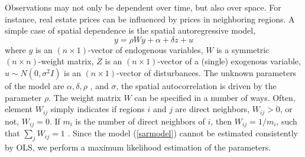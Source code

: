 \documentclass{article}
\begin{document}
Observations may not only be dependent over time, but also over space. For
instance, real estate prices can be influenced by prices in neighboring
regions. A simple case of spatial dependence is the spatial autoregressive
model,%
\begin{equation}
y=\rho Wy+\alpha +\delta z+u  \label{sarmodel}
\end{equation}%
where $y$ is an $\left( n\times 1\right) $-vector of endogenous variables, $%
W $ is a symmetric $\left( n\times n\right) $-weight matrix, $Z$ is an $%
\left( n\times 1\right) $-vector of a (single) exogenous variable, $u\sim
N\left( 0,\sigma ^{2}I\right) $ is an $\left( n\times 1\right) $-vector of
disturbances. The unknown parameters of the model are $\alpha ,\delta ,\rho $%
, and $\sigma $, the spatial autocorrelation is driven by the parameter $%
\rho $. The weight matrix $W$ can be specified in a number of ways. Often,
element $W_{ij}$ simply indicates if regions $i$ and $j$ are direct
neighbors, $W_{ij}>0$, or not, $W_{ij}=0$. If $m_{i}$ is the number of
direct neighbors of $i$, then $W_{ij}=1/m_{i}$, such that $\sum_{j}W_{ij}=1$%
. Since the model (\ref{sarmodel}) cannot be estimated consistently by OLS,
we perform a maximum likelihood estimation of the parameters.
\end{document}
